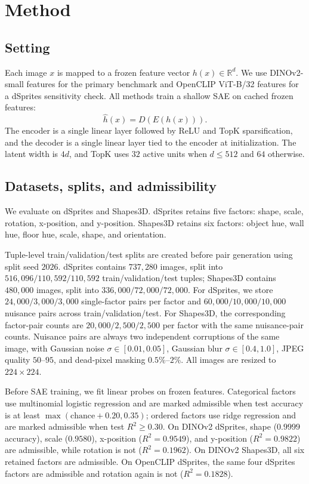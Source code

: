 \documentclass[10pt,twocolumn]{article}
\begin{document}
\section{Method}
\label{sec:method}
\subsection{Setting}
Each image $x$ is mapped to a frozen feature vector $h(x) \in \mathbb{R}^d$. We use DINOv2-small features for the primary benchmark and OpenCLIP ViT-B/32 features for a dSprites sensitivity check. All methods train a shallow SAE on cached frozen features:
\begin{equation}
\hat{h}(x) = D(E(h(x))).
\end{equation}
The encoder is a single linear layer followed by ReLU and TopK sparsification, and the decoder is a single linear layer tied to the encoder at initialization. The latent width is $4d$, and TopK uses $32$ active units when $d \leq 512$ and $64$ otherwise.

\subsection{Datasets, splits, and admissibility}
We evaluate on dSprites and Shapes3D. dSprites retains five factors: shape, scale, rotation, x-position, and y-position. Shapes3D retains six factors: object hue, wall hue, floor hue, scale, shape, and orientation.

Tuple-level train/validation/test splits are created before pair generation using split seed $2026$. dSprites contains $737{,}280$ images, split into $516{,}096/110{,}592/110{,}592$ train/validation/test tuples; Shapes3D contains $480{,}000$ images, split into $336{,}000/72{,}000/72{,}000$. For dSprites, we store $24{,}000/3{,}000/3{,}000$ single-factor pairs per factor and $60{,}000/10{,}000/10{,}000$ nuisance pairs across train/validation/test. For Shapes3D, the corresponding factor-pair counts are $20{,}000/2{,}500/2{,}500$ per factor with the same nuisance-pair counts. Nuisance pairs are always two independent corruptions of the same image, with Gaussian noise $\sigma \in [0.01, 0.05]$, Gaussian blur $\sigma \in [0.4, 1.0]$, JPEG quality $50$--$95$, and dead-pixel masking $0.5\%$--$2\%$. All images are resized to $224 \times 224$.

Before SAE training, we fit linear probes on frozen features. Categorical factors use multinomial logistic regression and are marked admissible when test accuracy is at least $\max(\mathrm{chance}+0.20, 0.35)$; ordered factors use ridge regression and are marked admissible when test $R^2 \geq 0.30$. On DINOv2 dSprites, shape ($0.9999$ accuracy), scale ($0.9580$), x-position ($R^2 = 0.9549$), and y-position ($R^2 = 0.9822$) are admissible, while rotation is not ($R^2 = 0.1962$). On DINOv2 Shapes3D, all six retained factors are admissible. On OpenCLIP dSprites, the same four dSprites factors are admissible and rotation again is not ($R^2 = 0.1828$).
\end{document}

